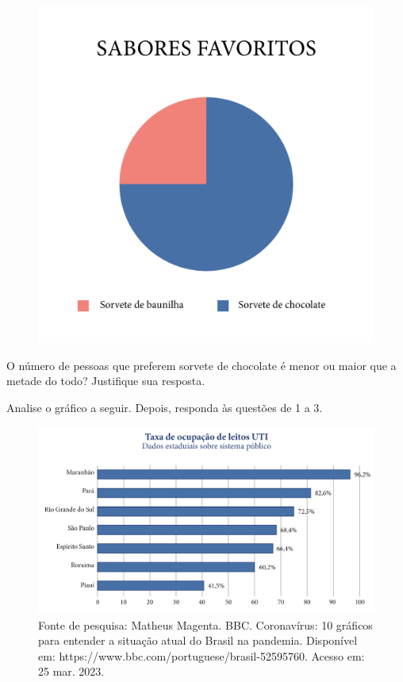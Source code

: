 \begin{figure}[htpb!]
\centering
\includegraphics[width=.7\textwidth]{../ilustracoes/POR5/SAEB_5ANO_POR_FIGURA1.png}
\end{figure}

O número de pessoas que preferem sorvete de chocolate é menor ou maior que a metade do todo? Justifique sua resposta.


\pagebreak
{}

\noindent{} Analise o gráfico a seguir. Depois, responda às questões de 1 a 3.

\begin{figure}[htpb!]
\includegraphics[width=\textwidth]{../ilustracoes/POR5/SAEB_5ANO_POR_FIGURA5.png}
\caption{Fonte de pesquisa: Matheus Magenta. BBC. Coronavírus: 10 gráficos para entender a situação atual do Brasil na pandemia. Disponível em: https://www.bbc.com/portuguese/brasil-52595760. Acesso em: 25 mar. 2023.}
\end{figure}

